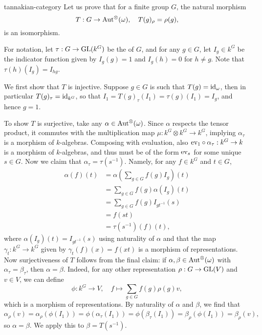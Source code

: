 \begin{example}{tannakian-category}
    Let us prove that for a finite group $G$, the natural morphism
    \[ T : G \to \textup{Aut}^\otimes(\omega), \quad T(g)_\rho = \rho(g) , \]
    is an isomorphism.
    
    For notation, let $\tau : G \to \textup{GL}(k^G)$ be the  of $G$, and for any $g \in G$, let $I_g \in k^G$ be the indicator function given by $I_g(g) = 1$ and $I_g(h) = 0$ for $h \ne g$. Note that $\tau(h)(I_g) = I_{hg}$.
    
    We first show that $T$ is injective. Suppose $g \in G$ is such that $T(g) = \textup{id}_\omega$, then in particular $T(g)_\tau = \textup{id}_{k^G}$, so that $I_1 = T(g)_\tau(I_1) = \tau(g)(I_1) = I_g$, and hence $g = 1$.
    
    To show $T$ is surjective, take any $\alpha \in \textup{Aut}^\otimes(\omega)$. Since $\alpha$ respects the tensor product, it commutes with the multiplication map $\mu : k^G \otimes k^G \to k^G$, implying $\alpha_\tau$ is a morphism of $k$-algebras. Composing with evaluation, also $\textup{ev}_1 \circ \alpha_\tau : k^G \to k$ is a morphism of $k$-algebras, and thus must be of the form $\textup{ev}_s$ for some unique $s \in G$. Now we claim that $\alpha_\tau = \tau(s^{-1})$. Namely, for any $f \in k^G$ and $t \in G$,
    \[ \begin{aligned}
        \alpha(f)(t)
            &= \alpha \left( \sum_{g \in G} f(g) I_g \right) (t) \\
            &= \sum_{g \in G} f(g) \alpha(I_g) (t) \\
            &= \sum_{g \in G} f(g) I_{gt^{-1}}(s) \\
            &= f(st) \\
            &= \tau(s^{-1})(f)(t) ,
    \end{aligned} \]
    where $\alpha(I_g)(t) = I_{gt^{-1}}(s)$ using naturality of $\alpha$ and that the map $\gamma_t : k^G \to k^G$ given by $\gamma_t(f)(x) = f(xt)$ is a morphism of representations. Now surjectiveness of $T$ follows from the final claim: if $\alpha, \beta \in \textup{Aut}^\otimes(\omega)$ with $\alpha_\tau = \beta_\tau$, then $\alpha = \beta$. Indeed, for any other representation $\rho : G \to \textup{GL}(V)$ and $v \in V$, we can define
    \[ \phi : k^G \to V, \quad f \mapsto \sum_{g \in G} f(g) \rho(g) v , \]
    which is a morphism of representations. By naturality of $\alpha$ and $\beta$, we find that
    \[ \alpha_\rho(v) = \alpha_\rho(\phi(I_1)) = \phi(\alpha_\tau(I_1)) = \phi(\beta_\tau(I_1)) = \beta_\rho(\phi(I_1)) = \beta_\rho(v) , \]
    so $\alpha = \beta$. We apply this to $\beta = T(s^{-1})$.
\end{example}

